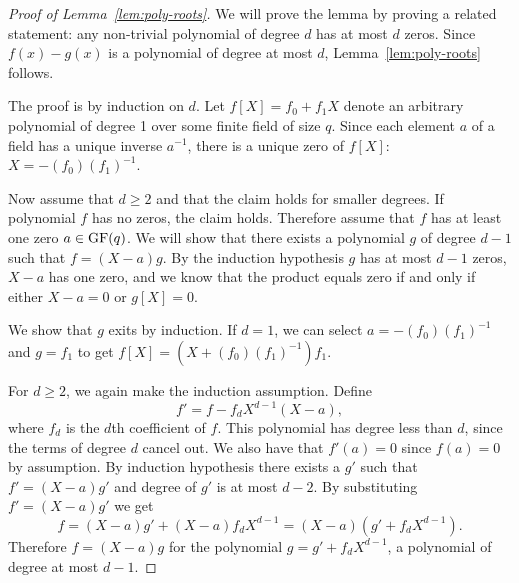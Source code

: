 \begin{proof}[Proof of Lemma~\ref{lem:poly-roots}]
  We will prove the lemma by proving a related statement: any non-trivial polynomial of degree $d$ has at most $d$ zeros. Since $f(x) - g(x)$ is a polynomial of degree at most $d$, Lemma~\ref{lem:poly-roots} follows.
  
  The proof is by induction on $d$. Let $f[X] = f_0 + f_1 X$ denote an arbitrary polynomial of degree 1 over some finite field of size $q$. Since each element $a$ of a field has a unique inverse $a^{-1}$, there is a unique zero of $f[X]$: $X = -(f_0)(f_1)^{-1}$.
  
  Now assume that $d \geq 2$ and that the claim holds for smaller degrees. If polynomial $f$ has no zeros, the claim holds. Therefore assume that $f$ has at least one zero $a \in \operatorname{GF}(q)$. We will show that there exists a polynomial $g$ of degree $d-1$ such that $f = (X-a)g$. By the induction hypothesis $g$ has at most $d-1$ zeros, $X-a$ has one zero, and we know that the product equals zero if and only if either $X-a = 0$ or $g[X] = 0$.
  
  We show that $g$ exits by induction. If $d=1$, we can select $a = -(f_0)(f_1)^{-1}$ and $g = f_1$ to get $f[X] = (X + (f_0)(f_1)^{-1})f_1$.
  
  For $d \geq 2$, we again make the induction assumption. Define
  \[
  f' = f - f_d X^{d-1} (X-a),
  \]
  where $f_d$ is the $d$th coefficient of $f$. This polynomial has degree less than $d$, since the terms of degree $d$ cancel out. We also have that $f'(a) = 0$ since $f(a) = 0$ by assumption. By induction hypothesis there exists a $g'$ such that $f' = (X-a)g'$ and degree of $g'$ is at most $d-2$. By substituting $f' = (X-a)g'$ we get
  \[
    f = (X-a)g' + (X-a)f_d X^{d-1} = (X-a)(g' + f_d X^{d-1}).
  \]
  Therefore $f = (X-a)g$ for the polynomial $g = g' + f_d X^{d-1}$, a polynomial of degree at most $d-1$.
\end{proof}
